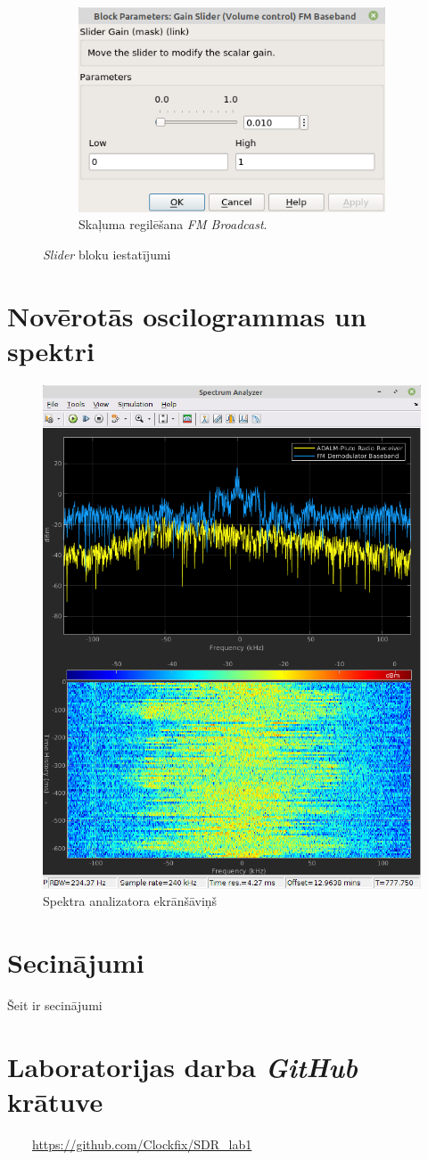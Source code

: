 \documentclass[a4paper,12pt]{extarticle}    %
\begin{document}
\begin{figure}[H]
\begin{subfigure}[t]{0.45\textwidth}
		\includegraphics[trim={0cm 0cm 0cm 0cm},clip, angle=0, width=0.99\linewidth ]{pictures/gain2.png}
		\caption{Skaļuma regilēšana \textit{FM Broadcast}.}\label{fig:volume2}
	\end{subfigure}
	\caption{\textit{Slider} bloku iestatījumi}
	\label{fig:sliders}
\end{figure} 
\section{Novērotās oscilogrammas un spektri}
%
\begin{figure}[H]
  	 \centering
  		\includegraphics[trim={0cm 0cm 0cm 0cm},clip, angle=0, width=0.5\linewidth ]{pictures/spectrum_analyzer.png}
  		\caption{Spektra analizatora ekrānšāviņš}\label{fig:spectrum_analyzer}
\end{figure}
%
\section{Secinājumi}
%
Šeit ir secinājumi
%
\section{Laboratorijas darba \textit{GitHub} krātuve}
%
\begin{left}
\href{https://github.com/Clockfix/SDR\_lab1}
	{} \ \ \ \ 
\href{https://github.com/Clockfix/SDR\_lab1}
	{https://github.com/Clockfix/SDR\_lab1}
\end{left}
%
\end{document}

